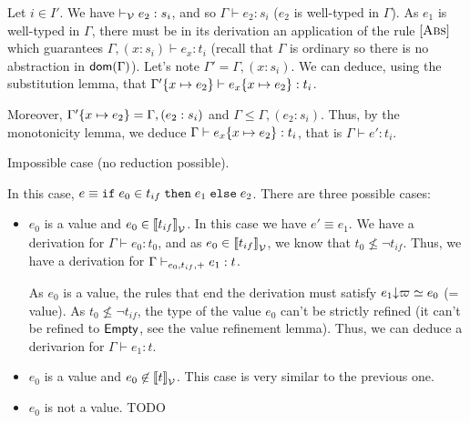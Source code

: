 \documentclass[a4paper]{article}
\theoremstyle{definition}
\begin{document}
\begin{description}
\begin{itemize}
            Let $i\in I'$. We have $\vvdash e_2:s_i$, and so $\Gamma \vdash e_2:s_i$ ($e_2$ is well-typed in $\Gamma$).
            As $e_1$ is well-typed in $\Gamma$, there must be in its derivation an application of the rule $\Rule{Abs}$
            which guarantees $\Gamma,(x:s_i) \vdash e_x:t_i$ (recall that $\Gamma$ is ordinary so there is no abstraction in $\dom\Gamma$).
            Let's note $\Gamma'=\Gamma,(x:s_i)$.
            We can deduce, using the substitution lemma, that $\Gamma'\subst x {e_2} \vdash e_x\subst x {e_2}: t_i$.
           
            Moreover, $\Gamma'\subst x {e_2} = \Gamma,(e_2:s_i)$ and $\Gamma \leq \Gamma,(e_2:s_i)$.
            Thus, by the monotonicity lemma, we deduce $\Gamma \vdash e_x\subst x {e_2}: t_i$,
            that is $\Gamma \vdash e': t_i$.
          \end{itemize}
          \item[\Rule{Abs}] Impossible case (no reduction possible).
          \item[\Rule{If}] In this case, $e\equiv \ite {e_0} {t_{if}} {e_1} {e_2}$. There are three possible cases:
          \begin{itemize}
            \item $e_0$ is a value and $e_0 \in \valsemantic{t_{if}}$. In this case we have $e' \equiv e_1$.
            We have a derivation for $\Gamma \vdash e_0: t_0$, and as $e_0 \in \valsemantic{t_{if}}$, we know
            that $t_0 \not\leq \neg t_{if}$. Thus, we have a derivation for $\Gamma \cvdash + {e_0} {t_{if}} e_1 : t$.

            As $e_0$ is a value, the  rules that end the derivation must satisfy $\occ {e_1} \varpi \simeq e_0$ (= value).
            As $t_0 \not\leq \neg t_{if}$, the type of the value $e_0$ can't be strictly refined (it can't be refined to $\Empty$, see the value refinement lemma).
            Thus, we can deduce a derivarion for $\Gamma \vdash e_1: t$.
            \item $e_0$ is a value and $e_0 \not\in \valsemantic{t}$. This case is very similar to the previous one.
            \item $e_0$ is not a value. TODO
          \end{itemize}
        \end{description}
\end{document}
